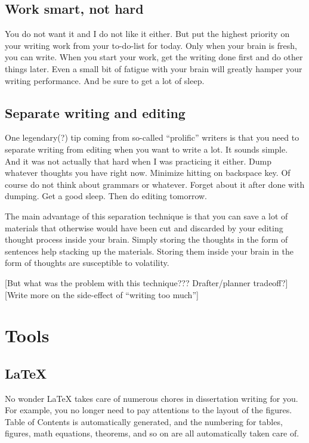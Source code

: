 \documentclass[11pt]{article}
\begin{document}
\subsection{Work smart, not hard}

You do not want it and I do not like it either. But put the highest priority
on your writing work from your to-do-list for today. Only when your brain is
fresh, you can write. When you start your work, get the writing done first and
do other things later. Even a small bit of fatigue with your brain will
greatly hamper your writing performance. And be sure to get a lot of sleep.

\subsection{Separate writing and editing}
One legendary(?) tip coming from so-called ``prolific'' writers is
that you need to separate writing from editing when you want to write
a lot. It sounds simple. And it was not actually that hard when I
was practicing it either. Dump whatever thoughts you have right now.
Minimize hitting on backspace key. Of course do not think about grammars
or whatever. Forget about it after done with dumping. Get a good sleep.
Then do editing tomorrow.

The main advantage of this separation technique is that you can save a lot of
materials that otherwise would have been cut and discarded by your editing
thought process inside your brain. Simply storing the thoughts in the form of
sentences help stacking up the materials.  Storing them inside your brain in
the form of thoughts are susceptible to volatility.

[But what was the problem with this technique??? Drafter/planner tradeoff?]
[Write more on the side-effect of ``writing too much'']

\section{Tools}

\subsection{LaTeX}
No wonder LaTeX takes care of numerous chores in dissertation writing for you.
For example, you no longer need to pay attentions to the layout of the
figures.  Table of Contents is automatically generated, and the numbering for
tables, figures, math equations, theorems, and so on are all automatically
taken care of. 
\end{document}
